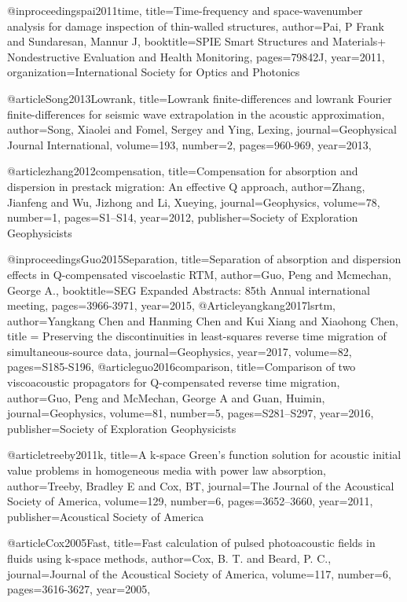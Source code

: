 @inproceedings{pai2011time,
  title={Time-frequency and space-wavenumber analysis for damage inspection of thin-walled structures},
  author={Pai, P Frank and Sundaresan, Mannur J},
  booktitle={SPIE Smart Structures and Materials+ Nondestructive Evaluation and Health Monitoring},
  pages={79842J},
  year={2011},
  organization={International Society for Optics and Photonics}
}


@article{Song2013Lowrank,
  title={Lowrank finite-differences and lowrank {F}ourier finite-differences for seismic wave extrapolation in the acoustic approximation},
  author={Song, Xiaolei and Fomel, Sergey and Ying, Lexing},
  journal={Geophysical Journal International},
  volume={193},
  number={2},
  pages={960-969},
  year={2013},
}

@article{zhang2012compensation,
  title={Compensation for absorption and dispersion in prestack migration: {A}n effective {Q} approach},
  author={Zhang, Jianfeng and Wu, Jizhong and Li, Xueying},
  journal={Geophysics},
  volume={78},
  number={1},
  pages={S1--S14},
  year={2012},
  publisher={Society of Exploration Geophysicists}
}

@inproceedings{Guo2015Separation,
  title={Separation of absorption and dispersion effects in {Q}-compensated viscoelastic {RTM}},
  author={Guo, Peng and Mcmechan, George A.},
  booktitle={SEG Expanded Abstracts: 85th Annual international meeting},
  pages={3966-3971},
  year={2015},
}
@Article{yangkang2017lsrtm,
  author={Yangkang Chen and Hanming Chen and Kui Xiang and Xiaohong Chen},
  title = {Preserving the discontinuities in least-squares reverse time migration of simultaneous-source data},
  journal={Geophysics},
  year=2017,
  volume=82,
  pages={S185-S196},
}
@article{guo2016comparison,
  title={Comparison of two viscoacoustic propagators for {Q}-compensated reverse time migration},
  author={Guo, Peng and McMechan, George A and Guan, Huimin},
  journal={Geophysics},
  volume={81},
  number={5},
  pages={S281--S297},
  year={2016},
  publisher={Society of Exploration Geophysicists}
}


@article{treeby2011k,
  title={A k-space Green's function solution for acoustic initial value problems in homogeneous media with power law absorption},
  author={Treeby, Bradley E and Cox, BT},
  journal={The Journal of the Acoustical Society of America},
  volume={129},
  number={6},
  pages={3652--3660},
  year={2011},
  publisher={Acoustical Society of America}
}

@article{Cox2005Fast,
  title={Fast calculation of pulsed photoacoustic fields in fluids using k-space methods},
  author={Cox, B. T. and Beard, P. C.},
  journal={Journal of the Acoustical Society of America},
  volume={117},
  number={6},
  pages={3616-3627},
  year={2005},
}

